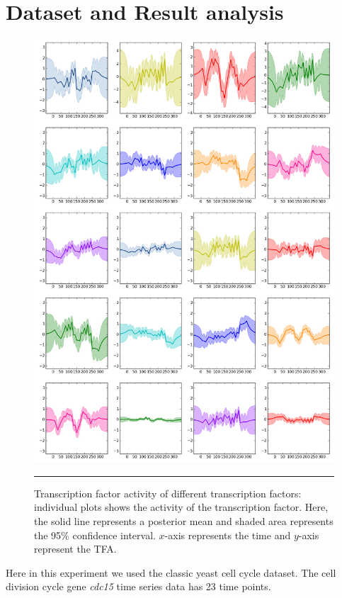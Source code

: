 \section{Dataset and Result analysis}
\begin{figure}
	\centering
	\includegraphics[width=.95\textwidth,keepaspectratio]{diagrams/OU20TF2.png}
	\rule{50em}{0.5pt}
	\caption[Transcription factor activity of different transcription factor]{Transcription factor activity of different transcription factors: individual plots shows the activity of the transcription factor. Here, the solid line represents a posterior mean and shaded area represents the 95\% confidence interval. $x$-axis represents the time and $y$-axis represent the TFA.}
	\label{fig:TFA_of_20TF}
\end{figure}

Here in this experiment we used the classic \cite{Spellman:1998} yeast cell cycle dataset. The cell division cycle gene \emph{cdc15} time series data has 23 time points. 

